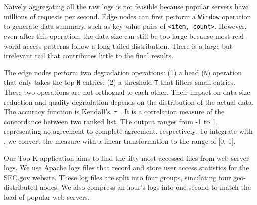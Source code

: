 Naively aggregating all the raw logs is not feasible because popular servers
have millions of requests per second. Edge nodes can first perform a
\texttt{Window} operation to generate data summary, such as key-value pairs of
\texttt{<item, count>}. However, even after this operation, the data size can
still be too large because most real-world access patterns follow a long-tailed
distribution. There is a large-but-irrelevant tail that contributes little to
the final results.

The edge nodes perform two degradation operations: (1) a head (\texttt{N})
operation that only takes the top \texttt{N} entries; (2) a threshold \texttt{T}
that filters small entries. These two operations are not orthognal to each
other. Their impact on data size reduction and quality degradation depends on
the distribution of the actual data. The accuracy function is
Kendall's~$\tau$~\cite{abdi2007kendall}. It is a correlation measure of the
concordance between two ranked list. The output ranges from -1 to 1,
representing no agreement to complete agreement, respectively. To integrate with
\sysname{}, we convert the measure with a linear transformation to the range of
[0, 1].

Our Top-K application aims to find the fifty most accessed files from web server
logs. We use Apache logs files that record and store user access statistics for
the \href{https://www.sec.gov}{SEC.gov} website. These log files are split into
four groups, simulating four geo-distributed nodes. We also compress an hour's
logs into one second to match the load of popular web servers.

